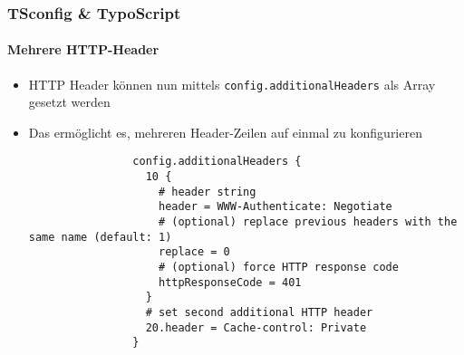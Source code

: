 
\begin{frame}[fragile]
	\frametitle{TSconfig \& TypoScript}
	\framesubtitle{Mehrere HTTP-Header}

	\begin{itemize}

		\item HTTP Header können nun mittels \small\texttt{config.additionalHeaders}\normalsize\newline
			als Array gesetzt werden
		\item Das ermöglicht es, mehreren Header-Zeilen auf einmal zu konfigurieren

			\begin{lstlisting}
				config.additionalHeaders {
				  10 {
				    # header string
				    header = WWW-Authenticate: Negotiate
				    # (optional) replace previous headers with the same name (default: 1)
				    replace = 0
				    # (optional) force HTTP response code
				    httpResponseCode = 401
				  }
				  # set second additional HTTP header
				  20.header = Cache-control: Private
				}
			\end{lstlisting}

	\end{itemize}

\end{frame}


